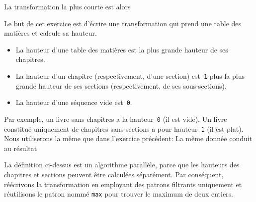 La transformation la plus courte est alors


Le but de cet exercice est d'écrire une transformation \XSLT qui prend
une table des matières et calcule sa hauteur.
\begin{itemize}

  \item La hauteur d'une table des matières est la plus grande hauteur
  de ses chapitres.

  \item La hauteur d'un chapitre (respectivement, d'une section)
    est~\texttt{1} plus la plus grande hauteur de ses sections
    (respectivement, de ses sous-sections).

  \item La hauteur d'une séquence vide est~\texttt{0}.

\end{itemize}
Par exemple, un livre sans chapitres a la hauteur~\texttt{0} (il est
vide). Un livre constitué uniquement de chapitres sans sections a pour
hauteur~\texttt{1} (il est plat). Nous utiliserons la même \DTD que
dans l'exercice précédent:
\noindent La même donnée
\noindent conduit au résultat
{\small}

La définition ci-dessus est un algorithme parallèle, parce que les
hauteurs des chapitres et sections peuvent être calculées
séparément. Par conséquent, réécrivons la transformation en employant
des patrons filtrants uniquement et réutilisons le patron nommé
\texttt{max} pour trouver le maximum de deux entiers.

